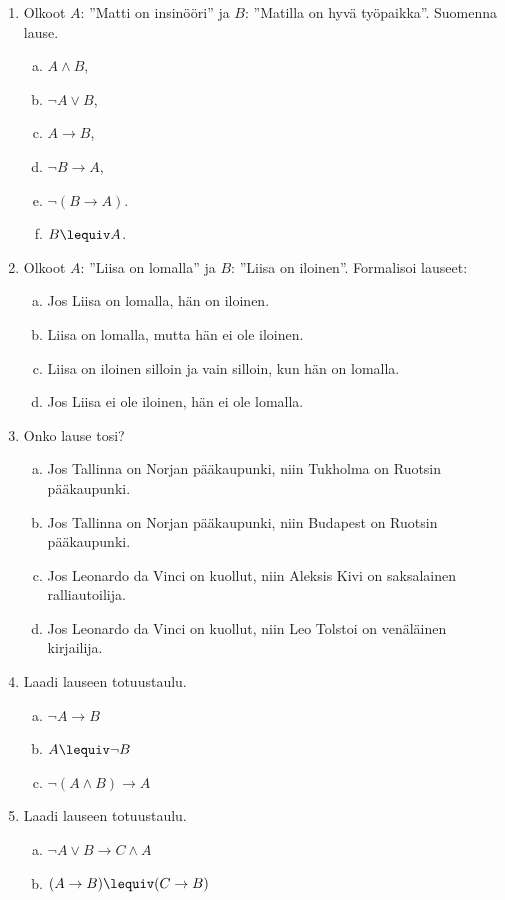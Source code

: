\begin{enumerate}
\item Olkoot $A$: ''Matti on insinööri'' ja $B$: ''Matilla on hyvä työpaikka''.
Suomenna lause.
\begin{enumerate}[a)]
\item $A\land B$,
\item $\lnot A \lor B$,
\item $A\to B$,
\item $\lnot B\to A$,
\item $\lnot( B \to A )$.
\item $ B \lequiv A$.
\end{enumerate}

\item Olkoot $A$: ''Liisa on lomalla'' ja $B$: ''Liisa on iloinen''. Formalisoi lauseet:
\begin{enumerate}[a)]
\item Jos Liisa on lomalla, hän on iloinen.
\item Liisa on lomalla, mutta hän ei ole iloinen.
\item Liisa on iloinen silloin ja vain silloin, kun hän on lomalla.
\item Jos Liisa ei ole iloinen, hän ei ole lomalla.
\end{enumerate}

\item Onko lause tosi?
\begin{enumerate}[a)]
\item Jos Tallinna on Norjan pääkaupunki, niin Tukholma on Ruotsin pääkaupunki.
\item Jos Tallinna on Norjan pääkaupunki, niin Budapest on Ruotsin pääkaupunki.
\item Jos Leonardo da Vinci on kuollut, niin Aleksis Kivi on saksalainen ralliautoilija.
\item Jos Leonardo da Vinci on kuollut, niin Leo Tolstoi on venäläinen kirjailija.
\end{enumerate}

\item Laadi lauseen totuustaulu.
\begin{enumerate}[a)]
\item $\lnot A \to B$
\item $A\lequiv \lnot B$
\item $\lnot( A\land B )\to A$
\end{enumerate}

\item Laadi lauseen totuustaulu.
\begin{enumerate}[a)]
\item $\lnot A \lor B \to C \land A$
\item $( A\to B ) \lequiv (C\to B)$
\end{enumerate}


\end{enumerate}
